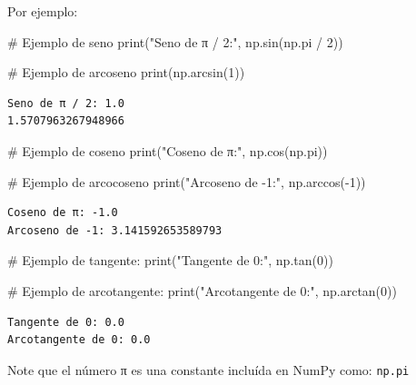 \documentclass[
  letterpaper,
  DIV=11,
  numbers=noendperiod]{scrreprt}
\newenvironment{Shaded}{\begin{snugshade}}{\end{snugshade}}
\newcommand{\BuiltInTok}[1]{\textcolor[rgb]{0.00,0.23,0.31}{#1}}
\newcommand{\CommentTok}[1]{\textcolor[rgb]{0.37,0.37,0.37}{#1}}
\newcommand{\DecValTok}[1]{\textcolor[rgb]{0.68,0.00,0.00}{#1}}
\newcommand{\NormalTok}[1]{\textcolor[rgb]{0.00,0.23,0.31}{#1}}
\newcommand{\OperatorTok}[1]{\textcolor[rgb]{0.37,0.37,0.37}{#1}}
\newcommand{\StringTok}[1]{\textcolor[rgb]{0.13,0.47,0.30}{#1}}
\begin{document}
Por ejemplo:

\begin{Shaded}
\begin{Highlighting}[]
\CommentTok{\# Ejemplo de seno}
\BuiltInTok{print}\NormalTok{(}\StringTok{"Seno de π / 2:"}\NormalTok{, np.sin(np.pi }\OperatorTok{/} \DecValTok{2}\NormalTok{))}

\CommentTok{\# Ejemplo de arcoseno}
\BuiltInTok{print}\NormalTok{(np.arcsin(}\DecValTok{1}\NormalTok{))}
\end{Highlighting}
\end{Shaded}

\begin{verbatim}
Seno de π / 2: 1.0
1.5707963267948966
\end{verbatim}

\begin{Shaded}
\begin{Highlighting}[]
\CommentTok{\# Ejemplo de coseno}
\BuiltInTok{print}\NormalTok{(}\StringTok{"Coseno de π:"}\NormalTok{, np.cos(np.pi))}

\CommentTok{\# Ejemplo de arcocoseno}
\BuiltInTok{print}\NormalTok{(}\StringTok{"Arcoseno de {-}1:"}\NormalTok{, np.arccos(}\OperatorTok{{-}}\DecValTok{1}\NormalTok{))}
\end{Highlighting}
\end{Shaded}

\begin{verbatim}
Coseno de π: -1.0
Arcoseno de -1: 3.141592653589793
\end{verbatim}

\begin{Shaded}
\begin{Highlighting}[]
\CommentTok{\# Ejemplo de tangente:}
\BuiltInTok{print}\NormalTok{(}\StringTok{"Tangente de 0:"}\NormalTok{, np.tan(}\DecValTok{0}\NormalTok{))}

\CommentTok{\# Ejemplo de arcotangente:}
\BuiltInTok{print}\NormalTok{(}\StringTok{"Arcotangente de 0:"}\NormalTok{, np.arctan(}\DecValTok{0}\NormalTok{))}
\end{Highlighting}
\end{Shaded}

\begin{verbatim}
Tangente de 0: 0.0
Arcotangente de 0: 0.0
\end{verbatim}

\begin{tcolorbox}[enhanced jigsaw, bottomrule=.15mm, leftrule=.75mm, opacityback=0, colback=white, toprule=.15mm, bottomtitle=1mm, opacitybacktitle=0.6, rightrule=.15mm, left=2mm, arc=.35mm, coltitle=black, title=\textcolor{quarto-callout-note-color}{\faInfo}\hspace{0.5em}{Note}, breakable, toptitle=1mm, colframe=quarto-callout-note-color-frame, titlerule=0mm, colbacktitle=quarto-callout-note-color!10!white]

Note que el número π es una constante incluída en NumPy como:
\texttt{np.pi}

\end{tcolorbox}
\end{document}
